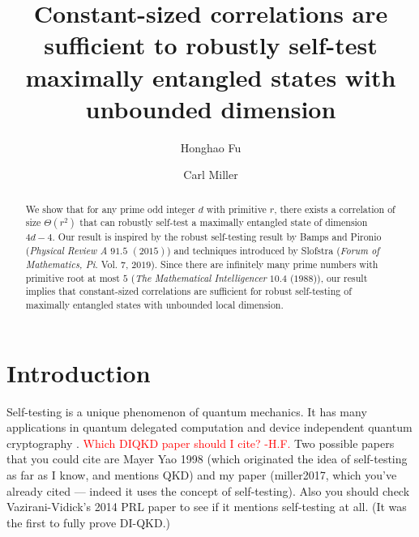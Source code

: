 \documentclass[11pt,letterpaper]{article}
\newcommand{\1}{\mathbb{1}}
\def\carl#1{{\color{blue} #1}}
\newcommand{\hfc}[1]{\textcolor{red}{#1 -H.F.}}
\theoremstyle{definition}
\begin{document}
\title{Constant-sized correlations are sufficient to 
robustly self-test maximally entangled states with unbounded dimension}

\author[1]{Honghao Fu}
\author[1,2]{Carl Miller}

\renewcommand\Affilfont{\itshape\small}



\maketitle

\begin{abstract}
	We show that for any prime odd integer $d$ with primitive $r$, there exists a correlation of size
	$\Theta(r^2)$ 
	that can robustly self-test a maximally entangled state of dimension $4d-4$. Our result is
	inspired by the robust self-testing result by Bamps and Pironio (\textit{Physical Review A} $91.5$ $(2015)$) and
	techniques introduced by Slofstra (\textit{Forum of Mathematics, Pi}. Vol. $7$, $2019$). Since there are
	infinitely many prime numbers with primitive root at most $5$ (\textit{The Mathematical Intelligencer} $10.4$ ($1988$)), 
	our result implies that constant-sized correlations are sufficient for robust self-testing of maximally entangled states
	with unbounded local dimension.
\end{abstract}
\section{Introduction}
\label{sec:intro}
Self-testing is a unique phenomenon of quantum mechanics. It has many applications in quantum
delegated computation \cite{ruv2013,coladan2017verifier} and device independent quantum cryptography
\cite{miller2017,fu2018,eat2018}.
\hfc{Which DIQKD paper should I cite?}
\carl{Two possible papers that you could cite are Mayer Yao 1998 (which originated the idea of self-testing as far as I know, and mentions QKD) and my paper (miller2017, which you've already cited --- indeed it uses the concept of self-testing).  Also you should check Vazirani-Vidick's 2014 PRL paper to see if it mentions self-testing at all.  (It was the first to fully prove DI-QKD.)}
\end{document}
